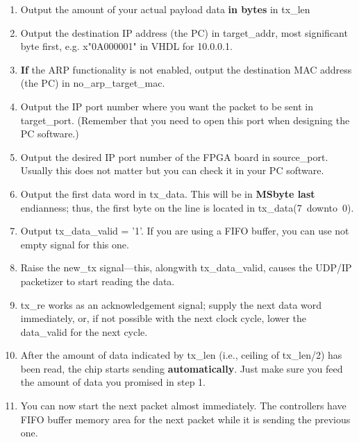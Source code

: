 \documentclass[a4paper,10pt,oneside,final]{article}
\begin{document}
\begin{enumerate}
\item Output the amount of your actual payload data \textbf{in bytes} in tx\_len
\item Output the destination IP address (the PC) in target\_addr, most
  significant byte first, e.g. x"0A000001" in VHDL for 10.0.0.1.
\item \textbf{If} the ARP functionality is not enabled, output the destination
  MAC address (the PC) in no\_arp\_target\_mac.
\item Output the IP port number where you want the packet to be sent
  in target\_port. (Remember that you need to open this port
  when designing the PC software.)
\item Output the desired IP port number of the FPGA board in
  source\_port. Usually this does not matter but you can check it
  in your PC software.
\item Output the first data word in tx\_data. This will be in
  \textbf{MSbyte last} endianness; thus, the first byte on the line is
  located in tx\_data(7~downto~0).
\item Output tx\_data\_valid = '1'. If you are using a FIFO buffer,
  you can use not empty signal for this one.
\item Raise the new\_tx signal---this, alongwith tx\_data\_valid,
  causes the UDP/IP packetizer to start reading the
  data. \footnotemark
\item tx\_re works as an acknowledgement signal; supply the next data
  word immediately, or, if not possible with the next clock cycle,
  lower the data\_valid for the next cycle.
\item After the amount of data indicated by tx\_len (i.e., ceiling of
  tx\_len/2) has been read, the chip starts sending
  \textbf{automatically}.  Just make sure you feed the amount of data
  you promised in step 1.
\item You can now start the next packet almost immediately. The
  controllers have FIFO buffer memory area for the next packet while
  it is sending the previous one.
\end{enumerate}

\end{document}
